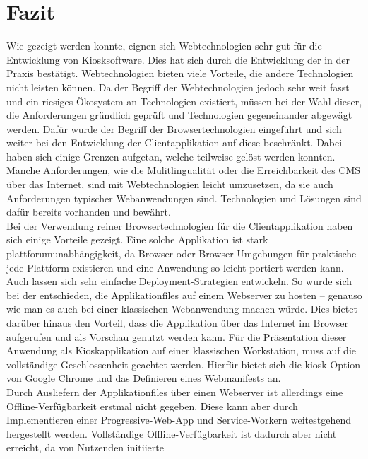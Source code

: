 \chapter{Fazit}
\label{chap:fazit}

Wie gezeigt werden konnte, eignen sich Webtechnologien sehr gut für
die Entwicklung von Kiosksoftware. Dies hat sich durch die Entwicklung
der \shst{} in der Praxis bestätigt. Webtechnologien bieten viele Vorteile, die andere
Technologien nicht leisten können. Da der Begriff der Webtechnologien jedoch
sehr weit fasst und ein riesiges Ökosystem an Technologien existiert, müssen bei
der Wahl dieser, die Anforderungen gründlich geprüft und Technologien gegeneinander 
abgewägt werden. Dafür wurde der Begriff der Browsertechnologien eingeführt und sich
weiter bei den Entwicklung der Clientapplikation auf diese beschränkt. 
Dabei haben sich einige Grenzen aufgetan, welche teilweise gelöst werden konnten.\\
Manche Anforderungen, wie die Mulitlingualität oder die Erreichbarkeit des CMS über das Internet,
sind mit Webtechnologien leicht umzusetzen, da sie auch Anforderungen typischer Webanwendungen sind.
Technologien und Lösungen sind dafür bereits vorhanden und bewährt.\\
Bei der Verwendung reiner Browsertechnologien für die Clientapplikation haben sich einige Vorteile 
gezeigt. Eine solche Applikation ist stark plattforumunabhängigkeit, da Browser oder Browser-Umgebungen
für praktische jede Plattform existieren und eine Anwendung so leicht portiert werden kann. Auch lassen
sich sehr einfache Deployment-Strategien entwickeln. So wurde sich bei der \shst{} entschieden, die
Applikationfiles auf einem Webserver zu hosten -- genauso wie man es auch bei einer klassischen %
Webanwendung machen würde. Dies bietet darüber hinaus den Vorteil, dass die Applikation über das Internet
im Browser aufgerufen und als Vorschau genutzt werden kann. Für die Präsentation dieser Anwendung als
Kioskapplikation auf einer klassischen Workstation, muss auf die vollständige Geschlossenheit geachtet werden.
Hierfür bietet sich die kiosk Option von Google Chrome und das Definieren eines Webmanifests an.\\
Durch Ausliefern der Applikationfiles über einen Webserver ist allerdings eine Offline-Verfügbarkeit
erstmal nicht gegeben. Diese kann aber durch Implementieren einer Progressive-Web-App und 
Service-Workern weitestgehend hergestellt werden.
Vollständige Offline-Verfügbarkeit ist dadurch aber nicht erreicht, da von Nutzenden initiierte
